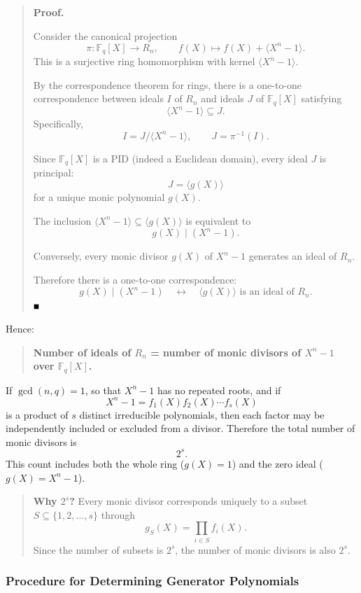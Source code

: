 \documentclass[11pt,oneside]{book}
\theoremstyle{plain}
\providecommand{\blacksquare}{\rule{1.1ex}{1.1ex}}
\theoremstyle{definition}
\theoremstyle{remark}
\begin{document}
\begin{quote}
\textbf{Proof.}

Consider the canonical projection
\[\pi: \mathbb{F}_q[X] \to R_n, \qquad f(X) \mapsto f(X)+\langle X^n-1 \rangle.\]
This is a surjective ring homomorphism with kernel
\(\langle X^n-1 \rangle\).

By the correspondence theorem for rings, there is a one-to-one
correspondence between ideals \(I\) of \(R_n\) and ideals \(J\) of
\(\mathbb{F}_q[X]\) satisfying \[\langle X^n-1 \rangle \subseteq J.\]
Specifically, \[I = J / \langle X^n-1 \rangle, \qquad J = \pi^{-1}(I).\]

Since \(\mathbb{F}_q[X]\) is a PID (indeed a Euclidean domain), every
ideal \(J\) is principal: \[J=\langle g(X) \rangle\] for a unique monic
polynomial \(g(X)\).

The inclusion \(\langle X^n-1 \rangle \subseteq \langle g(X) \rangle\)
is equivalent to \[g(X) \mid (X^n-1).\]

Conversely, every monic divisor \(g(X)\) of \(X^n-1\) generates an ideal
of \(R_n\).

Therefore there is a one-to-one correspondence:
\[g(X) \mid (X^n-1) \quad \longleftrightarrow \quad \langle g(X) \rangle \text{ is an ideal of } R_n.\]
\(\blacksquare\)
\end{quote}

Hence:

\begin{quote}
\textbf{Number of ideals of \(R_n\) = number of monic divisors of
\(X^n-1\) over \(\mathbb{F}_q[X]\).}
\end{quote}

If \(\gcd(n,q)=1\), so that \(X^n-1\) has no repeated roots, and if
\[X^n-1=f_1(X)f_2(X)\cdots f_s(X)\] is a product of \(s\) distinct
irreducible polynomials, then each factor may be independently included
or excluded from a divisor. Therefore the total number of monic divisors
is \[2^s.\] This count includes both the whole ring (\(g(X)=1\)) and the
zero ideal (\(g(X)=X^n-1\)).

\begin{quote}
\textbf{Why \(2^s\)?} Every monic divisor corresponds uniquely to a
subset \(S \subseteq \{1,2,\dots,s\}\) through
\[g_S(X)=\prod_{i\in S} f_i(X).\] Since the number of subsets is
\(2^s\), the number of monic divisors is also \(2^s\).
\end{quote}

\subsubsection{Procedure for Determining Generator
Polynomials}\label{procedure-for-determining-generator-polynomials}
\end{document}
